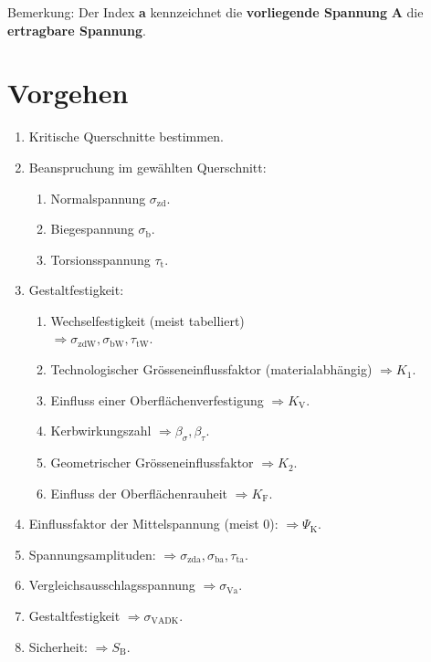
\label{chap:ermuedungsfestigkeit}
Bemerkung: Der Index \textbf{a} kennzeichnet die \textbf{vorliegende Spannung} \textbf{A} die \textbf{ertragbare Spannung}.

\section{Vorgehen} %
	\begin{enumerate}
		\item Kritische Querschnitte bestimmen.
		\item Beanspruchung im gewählten Querschnitt:
			\begin{enumerate}
				\item Normalspannung $\sigma_{\text{zd}}$.
				\item Biegespannung $\sigma_{\text{b}}$.
				\item Torsionsspannung $\tau_{\text{t}}$.
			\end{enumerate}
		\item Gestaltfestigkeit:
			\begin{enumerate}
				\item Wechselfestigkeit (meist tabelliert) \\
				$\Rightarrow \sigma_\text{zdW}, \sigma_\text{bW}, \tau_\text{tW}$.
				\item Technologischer Grösseneinflussfaktor (materialabhängig) $\Rightarrow K_1$.
				\item Einfluss einer Oberflächenverfestigung $\Rightarrow K_{\text{V}}$.
				\item Kerbwirkungszahl $\Rightarrow \beta_\sigma, \beta_\tau$.
				\item Geometrischer Grösseneinflussfaktor $\Rightarrow K_2$.
				\item Einfluss der Oberflächenrauheit $\Rightarrow K_{\text{F}}$.
			\end{enumerate}
		\item Einflussfaktor der Mittelspannung (meist 0): $\Rightarrow \Psi_{\text{K}}$.
		\item Spannungsamplituden: $\Rightarrow \sigma_{\text{zda}}, \sigma_{\text{ba}}, \tau_{\text{ta}}$.
		\item Vergleichsausschlagsspannung $\Rightarrow \sigma_{\text{Va}}$.
		\item Gestaltfestigkeit $\Rightarrow \sigma_{\text{VADK}}$.
		\item Sicherheit: $\Rightarrow S_{\text{B}}$.
	\end{enumerate}
